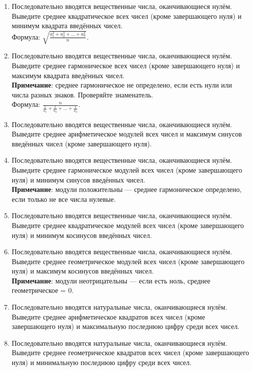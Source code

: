 \documentclass[12pt]{article}
\begin{document}
\begin{enumerate}
    \item Последовательно вводятся вещественные числа, оканчивающиеся нулём. Выведите среднее квадратическое всех чисел (кроме завершающего нуля) и минимум квадрата введённых чисел. \\
    Формула: $\sqrt{\frac{a_1^2 + a_2^2 + \dots + a_n^2}{n}}$.

    \item Последовательно вводятся вещественные числа, оканчивающиеся нулём. Выведите среднее гармоническое всех чисел (кроме завершающего нуля) и максимум квадрата введённых чисел. \\
    \textbf{Примечание}: среднее гармоническое не определено, если есть нули или числа разных знаков. Проверяйте знаменатель. \\
    Формула: $\frac{n}{\frac{1}{a_1} + \frac{1}{a_2} + \dots + \frac{1}{a_n}}$.

    \item Последовательно вводятся вещественные числа, оканчивающиеся нулём. Выведите среднее арифметическое модулей всех чисел и максимум синусов введённых чисел (кроме завершающего нуля).

    \item Последовательно вводятся вещественные числа, оканчивающиеся нулём. Выведите среднее гармоническое модулей всех чисел (кроме завершающего нуля) и минимум синусов введённых чисел. \\
    \textbf{Примечание}: модули положительны — среднее гармоническое определено, если только не все числа нулевые.

    \item Последовательно вводятся вещественные числа, оканчивающиеся нулём. Выведите среднее квадратическое модулей всех чисел (кроме завершающего нуля) и минимум косинусов введённых чисел.

    \item Последовательно вводятся вещественные числа, оканчивающиеся нулём. Выведите среднее геометрическое модулей всех чисел (кроме завершающего нуля) и максимум косинусов введённых чисел. \\
    \textbf{Примечание}: модули неотрицательны — если есть ноль, среднее геометрическое = 0.

    \item Последовательно вводятся натуральные числа, оканчивающиеся нулём. Выведите среднее арифметическое квадратов всех чисел (кроме завершающего нуля) и максимальную последнюю цифру среди всех чисел.

    \item Последовательно вводятся натуральные числа, оканчивающиеся нулём. Выведите среднее геометрическое квадратов всех чисел (кроме завершающего нуля) и минимальную последнюю цифру среди всех чисел.


\end{enumerate}
\end{document}

